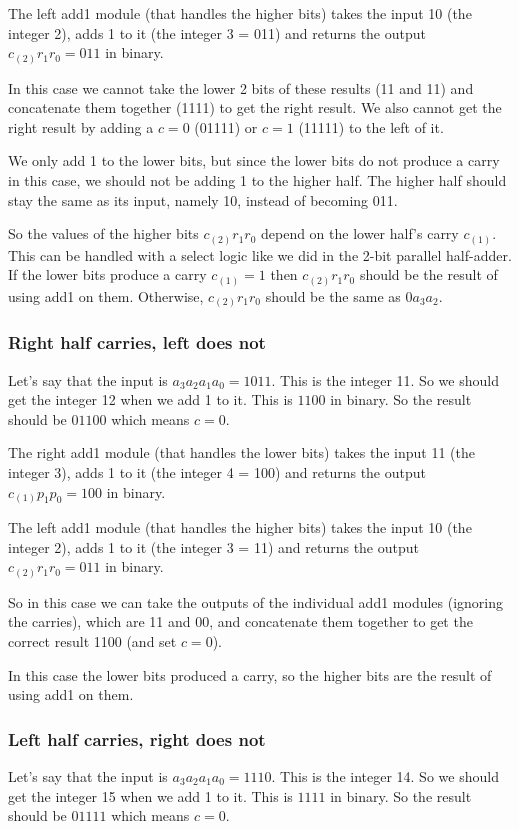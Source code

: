 \documentclass[14pt]{extarticle}
\begin{document}
The left add1 module (that handles the higher bits) takes the input 10 (the integer 2), adds 1 to it (the integer 3 = 011) and returns the output $c_{(2)}r_1r_0 = 011$ in binary.

In this case we cannot take the lower 2 bits of these results (11 and 11) and concatenate them together (1111) to get the right result. We also cannot get the right result by adding a $c = 0$ (01111) or $c = 1$ (11111) to the left of it. 

We only add 1 to the lower bits, but since the lower bits do not produce a carry in this case, we should not be adding 1 to the higher half. The higher half should stay the same as its input, namely 10, instead of becoming 011.

So the values of the higher bits $c_{(2)}r_1r_0$ depend on the lower half's carry $c_{(1)}$. This can be handled with a select logic like we did in the 2-bit parallel half-adder. If the lower bits produce a carry $c_{(1)} = 1$ then $c_{(2)}r_1r_0$ should be the result of using add1 on them. Otherwise, $c_{(2)}r_1r_0$ should be the same as $0a_3a_2$.

\subsubsection{Right half carries, left does not}
Let's say that the input is $a_3a_2a_1a_0 = 1011$. This is the integer 11. So we should get the integer 12 when we add 1 to it. This is $1100$ in binary. So the result should be $01100$ which means $c = 0$.

The right add1 module (that handles the lower bits) takes the input 11 (the integer 3), adds 1 to it (the integer 4 = 100) and returns the output $c_{(1)}p_1p_0 = 100$ in binary.

The left add1 module (that handles the higher bits) takes the input 10 (the integer 2), adds 1 to it (the integer 3 = 11) and returns the output $c_{(2)}r_1r_0 = 011$ in binary.

So in this case we can take the outputs of the individual add1 modules (ignoring the carries), which are 11 and 00, and concatenate them together to get the correct result 1100 (and set $c = 0$).

In this case the lower bits produced a carry, so the higher bits are the result of using add1 on them.

\subsubsection{Left half carries, right does not}
Let's say that the input is $a_3a_2a_1a_0 = 1110$. This is the integer 14. So we should get the integer 15 when we add 1 to it. This is $1111$ in binary. So the result should be $01111$ which means $c = 0$.
\end{document}
